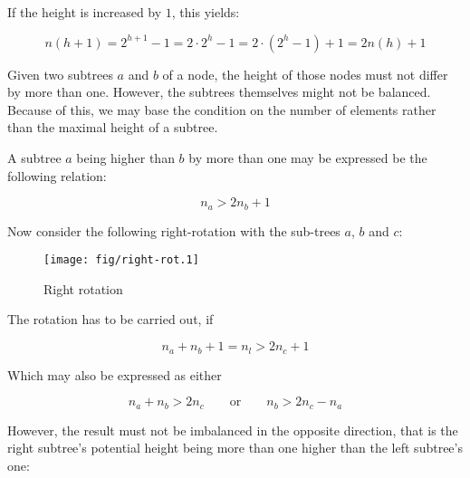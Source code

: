         If the height is increased by $1$, this yields:

        \begin{equation}
            n(h+1)
                = 2^{h+1}-1
                = 2\cdot 2^h -1
                = 2\cdot \left(2^h-1\right) +1
                = 2n(h)+1
        \end{equation}

        Given two subtrees $a$ and $b$ of a node, the height of those nodes
        must not differ by more than one.
        However, the subtrees themselves might not be balanced.
        Because of this, we may base the condition on the number of elements
        rather than the maximal height of a subtree.

        A subtree $a$ being higher than $b$ by more than one may be expressed
        be the following relation:

        \begin{equation}
            n_a > 2n_b + 1
        \end{equation}

        Now consider the following right-rotation with the sub-trees $a$, $b$
        and $c$:

        \begin{figure}[!h]
            \caption{Right rotation}
            \label{fig:AVL_ops-rebalance-rot}
            \begin{center}
                \texttt{[image: fig/right-rot.1]}
            \end{center}
        \end{figure}

        The rotation has to be carried out, if

        \begin{equation}
            n_a + n_b + 1 = n_l > 2n_c +1
            \label{sec:AVL_ops-rebalance-rot_preq}
        \end{equation}

        Which may also be expressed as either

        \begin{equation}
            n_a + n_b > 2n_c \qquad \mathrm{or} \qquad n_b > 2n_c - n_a
        \end{equation}

        However, the result must not be imbalanced in the opposite direction,
        that is the right subtree's potential height being more than one higher
        than the left subtree's one:


